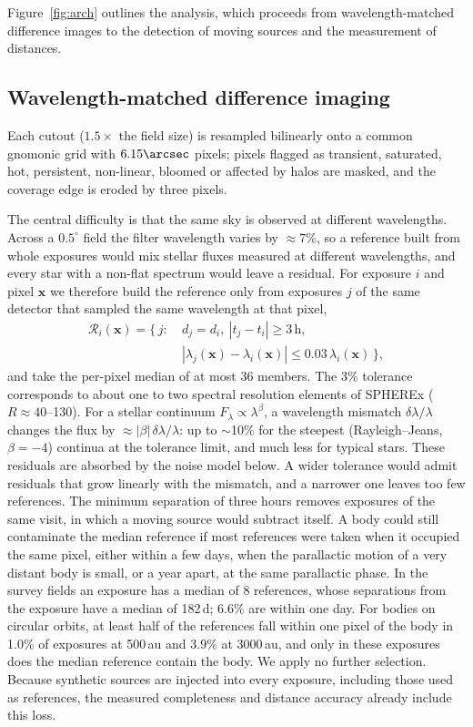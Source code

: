 \documentclass[twocolumn,linenumbers]{aastex702}
\begin{document}
Figure~\ref{fig:arch} outlines the analysis, which proceeds from wavelength-matched difference images to the detection of moving sources and the measurement of distances.

\subsection{Wavelength-matched difference imaging}\label{sec:diff}
Each cutout ($1.5\times$ the field size) is resampled bilinearly onto a common gnomonic grid with $6.15\arcsec$ pixels; pixels flagged as transient, saturated, hot, persistent, non-linear, bloomed or affected by halos are masked, and the coverage edge is eroded by three pixels.

The central difficulty is that the same sky is observed at different wavelengths. Across a $0.5^\circ$ field the filter wavelength varies by $\approx 7\%$, so a reference built from whole exposures would mix stellar fluxes measured at different wavelengths, and every star with a non-flat spectrum would leave a residual. For exposure $i$ and pixel $\mathbf{x}$ we therefore build the reference only from exposures $j$ of the same detector that sampled the same wavelength at that pixel,
\begin{equation}
\begin{split}
\mathcal{R}_i(\mathbf{x}) = \{\, j :\ & d_j = d_i,\ |t_j - t_i| \ge 3\,\mathrm{h},\\
& |\lambda_j(\mathbf{x}) - \lambda_i(\mathbf{x})| \le 0.03\,\lambda_i(\mathbf{x}) \,\},
\end{split}
\end{equation}
and take the per-pixel median of at most 36 members. The 3\% tolerance corresponds to about one to two spectral resolution elements of SPHEREx ($R \approx 40$--130). For a stellar continuum $F_\lambda \propto \lambda^{\beta}$, a wavelength mismatch $\delta\lambda/\lambda$ changes the flux by $\approx |\beta|\,\delta\lambda/\lambda$: up to $\sim$10\% for the steepest (Rayleigh--Jeans, $\beta = -4$) continua at the tolerance limit, and much less for typical stars. These residuals are absorbed by the noise model below. A wider tolerance would admit residuals that grow linearly with the mismatch, and a narrower one leaves too few references. The minimum separation of three hours removes exposures of the same visit, in which a moving source would subtract itself. A body could still contaminate the median reference if most references were taken when it occupied the same pixel, either within a few days, when the parallactic motion of a very distant body is small, or a year apart, at the same parallactic phase. In the survey fields an exposure has a median of 8 references, whose separations from the exposure have a median of 182\,d; 6.6\% are within one day. For bodies on circular orbits, at least half of the references fall within one pixel of the body in 1.0\% of exposures at 500\,au and 3.9\% at 3000\,au, and only in these exposures does the median reference contain the body. We apply no further selection. Because synthetic sources are injected into every exposure, including those used as references, the measured completeness and distance accuracy already include this loss.
\end{document}
